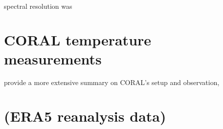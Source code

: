 



spectral resolution was 


\section{CORAL temperature measurements} 
\label{sec:coral}

\textcite{kaifler_compact_2021} provide a more extensive summary on CORAL's setup and observation,


\section{(ERA5 reanalysis data)}

